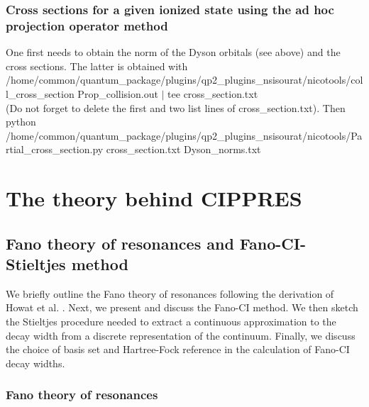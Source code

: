 \documentclass[a4paper, 10 pt]{report}
\begin{document}
\subsection{Cross sections for a given ionized state using the ad hoc projection operator method}

One first needs to obtain the norm of the Dyson orbitals (see above) and the cross sections. The latter is obtained with \\
/home/common/quantum\_package/plugins/qp2\_plugins\_nsisourat/nicotools/coll\_cross\_section Prop\_collision.out $|$ tee  cross\_section.txt\\
(Do not forget to delete the first and two list lines of cross\_section.txt). Then\\
python /home/common/quantum\_package/plugins/qp2\_plugins\_nsisourat/nicotools/Partial\_cross\_section.py cross\_section.txt Dyson\_norms.txt\\

\newpage

\chapter{The theory behind CIPPRES}

\section{Fano theory of resonances and Fano-CI-Stieltjes method}

We briefly outline the Fano theory of resonances following the 
derivation of Howat et al. \cite{Howat78:1575}. Next, we present and discuss 
the Fano-CI method. We then sketch the Stieltjes procedure needed to extract a 
continuous approximation to the decay width from a discrete representation of 
the continuum. Finally, we discuss the choice of basis set and Hartree-Fock 
reference in the calculation of Fano-CI decay widths.

\subsection{Fano theory of resonances}
\end{document}

